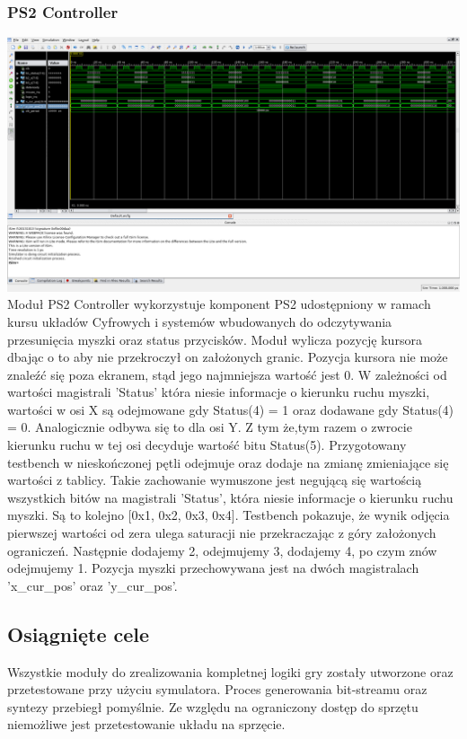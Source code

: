 \documentclass[polish,polish,a4paper]{article}
\begin{document}
\subsubsection{PS2 Controller}
\includegraphics[width=16cm]{ps2_tb.png}
\break
Moduł PS2 Controller wykorzystuje komponent PS2 udostępniony w ramach kursu układów 
Cyfrowych i systemów wbudowanych do odczytywania przesunięcia myszki
oraz status przycisków. 
Moduł wylicza pozycję kursora dbając o to aby nie przekroczył on założonych granic. 
Pozycja kursora nie może znaleźć się poza ekranem, stąd jego najmniejsza wartość jest 0.
W zależności od wartości magistrali 'Status' która niesie informacje o kierunku ruchu myszki,
wartości w osi X są odejmowane gdy Status(4) = 1 oraz dodawane gdy Status(4) = 0.
Analogicznie odbywa się to dla osi Y. Z tym że,tym razem o zwrocie kierunku ruchu w tej osi decyduje wartość bitu Status(5).
Przygotowany testbench w nieskończonej pętli odejmuje oraz dodaje na zmianę zmieniające się wartości z tablicy.
Takie zachowanie wymuszone jest negującą się wartością wszystkich bitów na magistrali 'Status', która niesie informacje o kierunku
ruchu myszki.
Są to kolejno [0x1, 0x2, 0x3, 0x4]. Testbench pokazuje, że wynik odjęcia pierwszej wartości od zera ulega saturacji
nie przekraczając z góry założonych ograniczeń.
Następnie dodajemy 2, odejmujemy 3, dodajemy 4, po czym znów odejmujemy 1.
Pozycja myszki przechowywana jest na dwóch magistralach 'x\_cur\_pos' oraz 'y\_cur\_pos'.

\subsection{Osiągnięte cele}
Wszystkie moduły do zrealizowania kompletnej logiki gry zostały utworzone oraz przetestowane przy użyciu symulatora.
Proces generowania bit-streamu oraz syntezy przebiegł pomyślnie.
Ze względu na ograniczony dostęp do sprzętu niemożliwe jest przetestowanie układu na sprzęcie.
\end{document}
